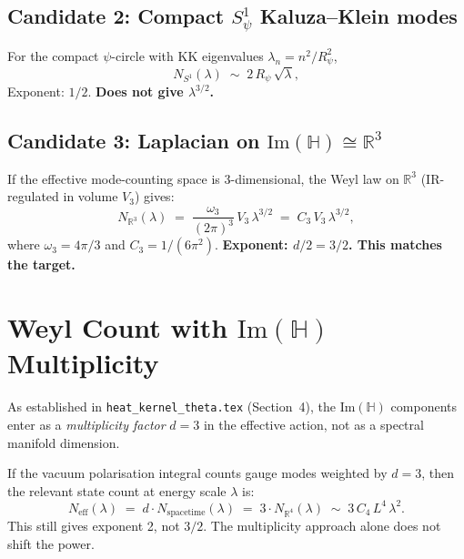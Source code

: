 \documentclass[11pt,a4paper]{article}
\theoremstyle{definition}
\theoremstyle{remark}
\begin{document}
\subsection{Candidate 2: Compact $S^1_\psi$ Kaluza–Klein modes}

For the compact $\psi$-circle with KK eigenvalues $\lambda_n = n^2/R_\psi^2$,
\begin{equation}
  N_{S^1}(\lambda) \;\sim\; 2\,R_\psi\,\sqrt{\lambda},
  \label{eq:N_S1}
\end{equation}
Exponent: $1/2$.
\textbf{Does not give $\lambda^{3/2}$.}

\subsection{Candidate 3: Laplacian on $\mathrm{Im}(\mathbb{H}) \cong \mathbb{R}^3$}

If the effective mode-counting space is 3-dimensional,
the Weyl law on $\mathbb{R}^3$ (IR-regulated in volume $V_3$) gives:
\begin{equation}
  N_{\mathbb{R}^3}(\lambda) \;=\; \frac{\omega_3}{(2\pi)^3}\,V_3\,\lambda^{3/2}
  \;=\; C_3\,V_3\,\lambda^{3/2},
  \label{eq:N_R3}
\end{equation}
where $\omega_3 = 4\pi/3$ and $C_3 = 1/(6\pi^2)$.
\textbf{Exponent: $d/2 = 3/2$.  This matches the target.}

\section{Weyl Count with $\mathrm{Im}(\mathbb{H})$ Multiplicity}
\label{sec:weyl_multiplicity}

As established in \texttt{heat\_kernel\_theta.tex} (Section~4),
the $\mathrm{Im}(\mathbb{H})$ components enter as a \emph{multiplicity factor}
$d = 3$ in the effective action, not as a spectral manifold dimension.

If the vacuum polarisation integral counts gauge modes weighted by $d = 3$,
then the relevant state count at energy scale $\lambda$ is:
\begin{equation}
  N_{\mathrm{eff}}(\lambda) \;=\; d \cdot N_{\mathrm{spacetime}}(\lambda)
  \;=\; 3 \cdot N_{\mathbb{R}^4}(\lambda)
  \;\sim\; 3\,C_4\,L^4\,\lambda^{2}.
  \label{eq:N_mult}
\end{equation}
This still gives exponent 2, not $3/2$.
The multiplicity approach alone does not shift the power.
\end{document}
